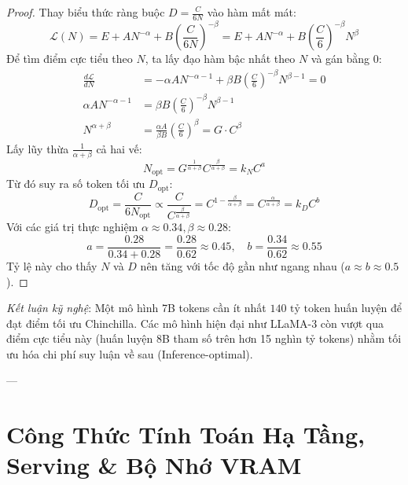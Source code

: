 \begin{proof}
Thay biểu thức ràng buộc $D = \frac{C}{6N}$ vào hàm mất mát:
\begin{equation*}
\mathcal{L}(N) = E + A N^{-\alpha} + B \left(\frac{C}{6N}\right)^{-\beta} = E + A N^{-\alpha} + B \left(\frac{C}{6}\right)^{-\beta} N^\beta
\end{equation*}
Để tìm điểm cực tiểu theo $N$, ta lấy đạo hàm bậc nhất theo $N$ và gán bằng 0:
\begin{align*}
\frac{d \mathcal{L}}{d N} &= - \alpha A N^{-\alpha - 1} + \beta B \left(\frac{C}{6}\right)^{-\beta} N^{\beta - 1} = 0 \\
\alpha A N^{-\alpha - 1} &= \beta B \left(\frac{C}{6}\right)^{-\beta} N^{\beta - 1} \\
N^{\alpha + \beta} &= \frac{\alpha A}{\beta B} \left(\frac{C}{6}\right)^\beta = G \cdot C^\beta
\end{align*}
Lấy lũy thừa $\frac{1}{\alpha + \beta}$ cả hai vế:
\begin{equation}
N_{\text{opt}} = G^{\frac{1}{\alpha + \beta}} C^{\frac{\beta}{\alpha + \beta}} = k_N C^a
\end{equation}
Từ đó suy ra số token tối ưu $D_{\text{opt}}$:
\begin{equation}
D_{\text{opt}} = \frac{C}{6 N_{\text{opt}}} \propto \frac{C}{C^{\frac{\beta}{\alpha + \beta}}} = C^{1 - \frac{\beta}{\alpha + \beta}} = C^{\frac{\alpha}{\alpha + \beta}} = k_D C^b
\end{equation}
Với các giá trị thực nghiệm $\alpha \approx 0.34, \beta \approx 0.28$:
\begin{equation*}
a = \frac{0.28}{0.34 + 0.28} = \frac{0.28}{0.62} \approx 0.45, \quad b = \frac{0.34}{0.62} \approx 0.55
\end{equation*}
Tỷ lệ này cho thấy $N$ và $D$ nên tăng với tốc độ gần như ngang nhau ($a \approx b \approx 0.5$).
\end{proof}

\textit{Kết luận kỹ nghệ}: Một mô hình 7B tokens cần ít nhất $140\text{ tỷ token}$ huấn luyện để đạt điểm tối ưu Chinchilla. Các mô hình hiện đại như LLaMA-3 còn vượt qua điểm cực tiểu này (huấn luyện 8B tham số trên hơn 15 nghìn tỷ tokens) nhằm tối ưu hóa chi phí suy luận về sau (Inference-optimal).

---

\section{Công Thức Tính Toán Hạ Tầng, Serving \& Bộ Nhớ VRAM}
\label{sec:app-math-infra-codex}

